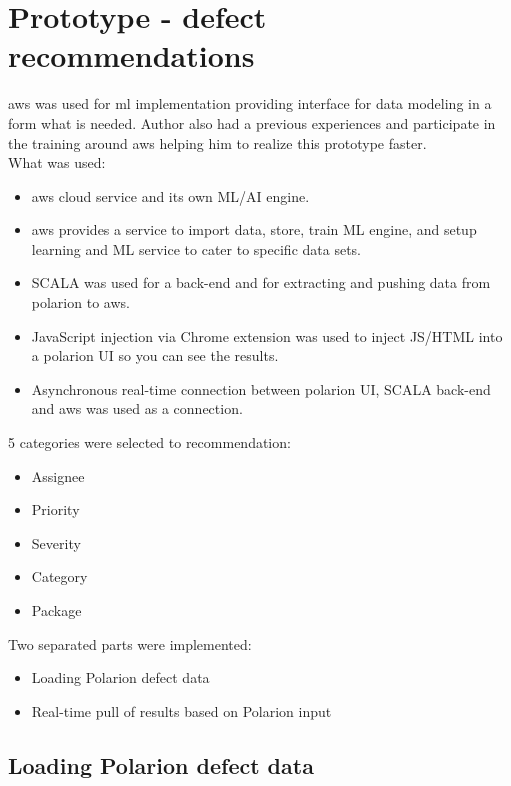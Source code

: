 \documentclass[thesis=M,english]{FITthesis}[2012/06/26]
\begin{document}
\pagebreak
\clearpage
\section{Prototype - defect recommendations}

\acrshort{aws} was used for \acrfull{ml} implementation providing interface for data modeling in a form what is needed. Author also had a previous experiences and participate in the training around \acrfull{aws} helping him to realize this prototype faster. \\

What was used:
\begin{itemize}[nosep]
\item \acrshort{aws} cloud service and its own ML/AI engine.
\item \acrshort{aws} provides a service to import data, store, train ML engine, and setup learning and ML service to cater to specific data sets. 
\item SCALA was used for a back-end and for extracting and pushing data from \acrshort{polarion} to \acrshort{aws}.
\item JavaScript injection via Chrome extension was used to inject JS/HTML into a \acrshort{polarion} UI so you can see the results.
\item Asynchronous real-time connection between \acrshort{polarion} UI, SCALA back-end and \acrshort{aws} was used as a connection.\\
\end{itemize}

5 categories were selected to recommendation:
\begin{itemize}[nosep]
	\item Assignee
	\item Priority
	\item Severity
	\item Category
	\item Package\\
\end{itemize}

Two separated parts were implemented:
\begin{itemize}[nosep]
	\item Loading Polarion defect data
	\item Real-time pull of results based on Polarion input\\
\end{itemize}

\subsection{Loading Polarion defect data}
\end{document}
